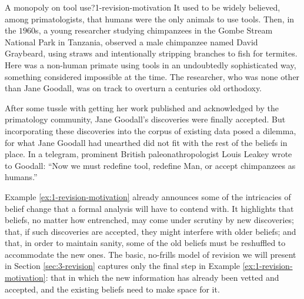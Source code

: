 \begin{xmpl}{A monopoly on tool use?}{1-revision-motivation}
	It used to be widely believed, among primatologists, 
	that humans were the only animals to use tools.
	Then, in the $1960$s, a young researcher studying chimpanzees in the 
	Gombe Stream National Park in Tanzania, observed a male chimpanzee
	named David Graybeard, using straws and intentionally 
	stripping branches to fish for termites.
	Here was a non-human primate
	using tools in an undoubtedly sophisticated way,
	something considered impossible at the time.
	The researcher, who was none other than Jane Goodall,
	was on track to overturn a centuries old orthodoxy.

	After some tussle with getting her work published and 
	acknowledged by the primatology community,
	Jane Goodall's discoveries were finally accepted.
	But incorporating these discoveries into the corpus 
	of existing data posed a dilemma,
	for what Jane Goodall had unearthed did not fit with 
	the rest of the beliefs in place.
	In a telegram, prominent British paleonathropologist Louis Leakey 
	wrote to Goodall: 
	``Now we must redefine tool, redefine Man, 
	or accept chimpanzees as humans.''
	\cite{Goodall10}
\end{xmpl}

Example \ref{ex:1-revision-motivation} already announces 
some of the intricacies of belief change
that a formal analysis will have to contend with.
It highlights that beliefs, no matter how entrenched, 
may come under scrutiny by new discoveries; 
that, if such discoveries are accepted, 
they might interfere with older beliefs; 
and that, in order to maintain sanity, 
some of the old beliefs must be reshuffled 
to accommodate the new ones.
The basic, no-frills model of revision
we will present in Section \ref{sec:3-revision}
captures only the final step 
in Example \ref{ex:1-revision-motivation}:
that in which the new information 
has already been vetted and accepted,
and the existing beliefs need to make space for it.

